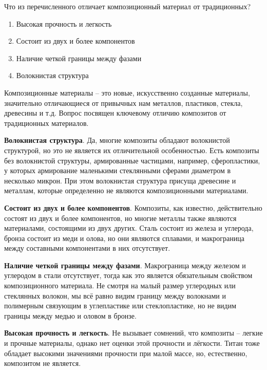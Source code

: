 
Что из перечисленного отличает композиционный материал от традиционных?

\begin{enumerate}
    \item Высокая прочность и легкость
    \item Состоит из двух и более компонентов
    \item Наличие четкой границы между фазами
    \item Волокнистая структура
\end{enumerate}

\explanationSection

Композиционные материалы – это новые, искусственно созданные материалы, значительно отличающиеся от привычных нам металлов, пластиков, стекла, древесины и т.д. Вопрос посвящен ключевому отличию композитов от традиционных материалов.

\textbf{Волокнистая структура}. Да, многие композиты обладают волокнистой структурой, но это не является их отличительной особенностью. Есть композиты без волокнистой структуры, армированные частицами, например, сферопластики, у которых армирование маленькими стеклянными сферами диаметром в несколько микрон. При этом волокнистая структура присуща древесине и металлам, которые определенно не являются композиционными материалами.

\textbf{Состоит из двух и более компонентов}. Композиты, как известно, действительно состоят из двух и более компонентов, но многие металлы также являются материалами, состоящими из двух других. Сталь состоит из железа и углерода, бронза состоит из меди и олова, но они являются сплавами, и макрограница между составными компонентами в них отсутствует.

\textbf{Наличие четкой границы между фазами}. Макрограница между железом и углеродом в стали отсутствует, тогда как это является обязательным свойством композиционного материала. Не смотря на малый размер углеродных или стеклянных волокон, мы всё равно видим границу между волокнами и полимерным связующим в углепластике или стеклопластике, но не видим границы между медью и оловом в бронзе.

\textbf{Высокая прочность и легкость}. Не вызывает сомнений, что композиты – легкие и прочные материалы, однако нет оценки этой прочности и лёгкости. Титан тоже обладает высокими значениями прочности при малой массе, но, естественно, композитом не является.

